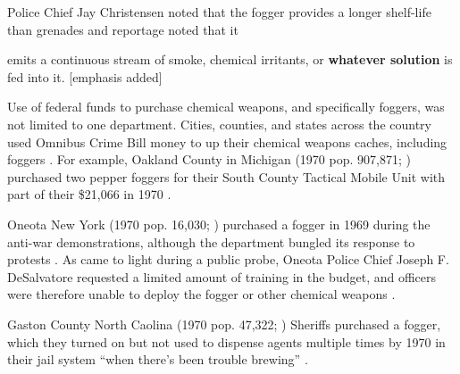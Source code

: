 \documentclass[
  11pt,
  titlepage]{krantz}
\renewenvironment{quote}{\begin{VF}}{\end{VF}}
\begin{document}
Police Chief Jay Christensen noted that the fogger provides a longer shelf-life than grenades and reportage noted that it

\begin{quote}
emits a continuous stream of smoke, chemical irritants, or \textbf{whatever solution} is fed into it. {[}emphasis added{]}

\end{quote}

Use of federal funds to purchase chemical weapons, and specifically foggers, was not limited to one department.
Cities, counties, and states across the country used Omnibus Crime Bill money to up their chemical weapons caches, including foggers \citep{Conheim1972}.
For example, Oakland County in Michigan (1970 pop. 907,871; \citet{USCB1970}) purchased two pepper foggers for their South County Tactical Mobile Unit with part of their \$21,066 in 1970 \citep{Conheim1972}.

Oneota New York (1970 pop. 16,030; \citet{USCB1970}) purchased a fogger in 1969 during the anti-war demonstrations, although the department bungled its response to protests \citep{Griffin1973}.
As came to light during a public probe, Oneota Police Chief Joseph F. DeSalvatore requested a limited amount of training in the budget, and officers were therefore unable to deploy the fogger or other chemical weapons \citep{Griffin1973}.

Gaston County North Caolina (1970 pop. 47,322; \citet{USCB1970}) Sheriffs purchased a fogger, which they turned on but not used to dispense agents multiple times by 1970 in their jail system ``when there's been trouble brewing'' \citep{Balloch1970}.
\end{document}
